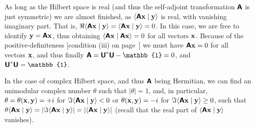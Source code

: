 {As long as the Hilbert space is real (and thus the self-adjoint transformation $ \textsf{\textbf{A}}$ is just symmetric)
we are almost finished, as
$ \langle \textsf{\textbf{A}} {\bf x} \mid {\bf y} \rangle$ is real, with vanishing imaginary part.
That is,
$
\Re  \langle \textsf{\textbf{A}} {\bf x} \mid {\bf y} \rangle   =
\langle \textsf{\textbf{A}} {\bf x} \mid {\bf y} \rangle  =0
$.
In this case, we are free to identify ${\bf y} = \textsf{\textbf{A}} {\bf x}$, thus obtaining
$\langle \textsf{\textbf{A}} {\bf x} \mid \textsf{\textbf{A}} {\bf x}  \rangle  =0$
for all vectors ${\bf x}$.
Because of the positive-definiteness
[condition (iii) on page~\pageref{2016-m-ch-fdvs-pd}]
we must have $ \textsf{\textbf{A}} {\bf x}  =0$
for all vectors ${\bf x}$, and thus finally
$\textsf{\textbf{A}}= \textsf{\textbf{U}}^\ast\textsf{\textbf{U}} - \mathbb{1} =0$,
and $\textsf{\textbf{U}}^\ast\textsf{\textbf{U}} = \mathbb{1}$.

In the case of complex Hilbert space, and thus  $\textsf{\textbf{A}}$ being Hermitian,
we can find an unimodular complex number $\theta$ such that $\vert \theta \vert =1$,
and, in particular,
$\theta = \theta ({\bf x} , {\bf y}) = +i$
for $\Im \langle \textsf{\textbf{A}} {\bf x} \mid {\bf y} \rangle < 0$
or
$\theta ({\bf x} , {\bf y}) = -i$
for $\Im \langle \textsf{\textbf{A}} {\bf x} \mid {\bf y} \rangle \ge 0$,
such that
$\theta \langle \textsf{\textbf{A}} {\bf x} \mid {\bf y} \rangle =
\vert \Im \langle \textsf{\textbf{A}} {\bf x} \mid {\bf y} \rangle \vert =
\vert \langle \textsf{\textbf{A}} {\bf x} \mid {\bf y} \rangle \vert$
(recall that the real part of $\langle \textsf{\textbf{A}} {\bf x} \mid {\bf y} \rangle$ vanishes).

}
